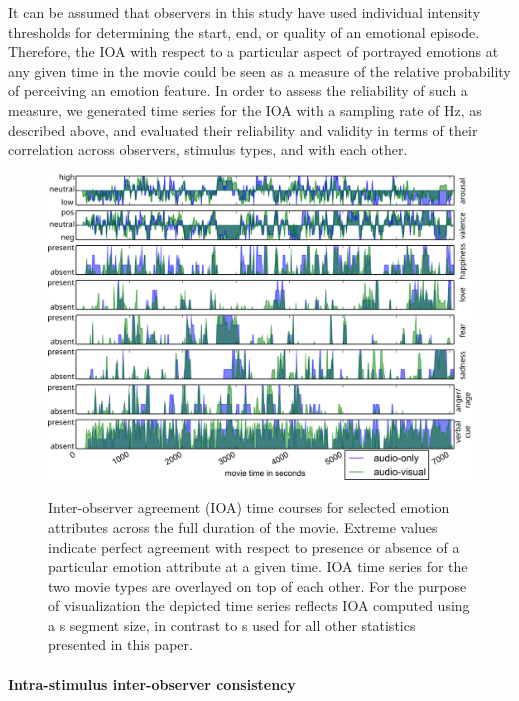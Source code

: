 \documentclass[10pt,a4paper,twocolumn]{article}
\begin{document}
It can be assumed that observers in this study have used individual intensity
thresholds for determining the start, end, or quality of an emotional episode.
Therefore, the IOA with respect to a particular aspect of portrayed emotions at
any given time in the movie could be seen as a measure of the relative
probability of perceiving an emotion feature. In order to assess the
reliability of such a measure, we generated time series for the IOA with a
sampling rate of \unit[1]{Hz}, as described above, and evaluated their
reliability and validity in terms of their correlation across observers,
stimulus types, and with each other.

\begin{figure}
  \centering
  \includegraphics[trim=10 75 70 50,clip,width=\linewidth]{figures/indicator_ts_allchar}\\
  \caption{Inter-observer agreement (IOA) time courses for selected emotion
    attributes across the full duration of the movie. Extreme values indicate
    perfect agreement with respect to presence or absence of a particular emotion
    attribute at a given time. IOA time series for the two movie types are
    overlayed on top of each other.
    For the purpose of
    visualization the depicted time series reflects IOA computed using a
    \unit[10]{s} segment size, in contrast to \unit[1]{s} used for all other
  statistics presented in this paper.}
  \label{fig:indicatortsallchar}
\end{figure}


\paragraph{Intra-stimulus inter-observer consistency}
\end{document}
